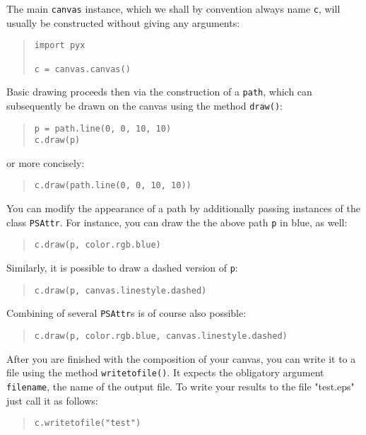 The main \verb|canvas| instance, which we shall by convention always
name \verb|c|, will usually be constructed without giving any
arguments:
\begin{quote}
\begin{verbatim}
import pyx

c = canvas.canvas()
\end{verbatim}
\end{quote}
Basic drawing proceeds then via the construction of a \verb|path|, which 
can subsequently be drawn on the canvas using the method \verb|draw()|:
\begin{quote}
\begin{verbatim}
p = path.line(0, 0, 10, 10)
c.draw(p)
\end{verbatim}
\end{quote}
or more concisely:
\begin{quote}
\begin{verbatim}
c.draw(path.line(0, 0, 10, 10))
\end{verbatim}
\end{quote}
You can modify the appearance of a path by additionally passing 
instances of the class \verb|PSAttr|. For instance, you can draw the 
the above path \verb|p| in blue, as well:
\begin{quote}
\begin{verbatim}
c.draw(p, color.rgb.blue)
\end{verbatim}
\end{quote}
Similarly, it is possible to draw a dashed version of \verb|p|:
\begin{quote}
\begin{verbatim}
c.draw(p, canvas.linestyle.dashed)
\end{verbatim}
\end{quote}
Combining of several \verb|PSAttr|s is of course also possible:
\begin{quote}
\begin{verbatim}
c.draw(p, color.rgb.blue, canvas.linestyle.dashed)
\end{verbatim}
\end{quote}
After you are finished with the composition of your canvas, you can
write it to a file using the method \verb|writetofile()|. It expects the
obligatory argument \verb|filename|, the name of the output
file. To write your results to the file "test.eps" just call it as follows:
\begin{quote}
\begin{verbatim}
c.writetofile("test")
\end{verbatim}
\end{quote}


